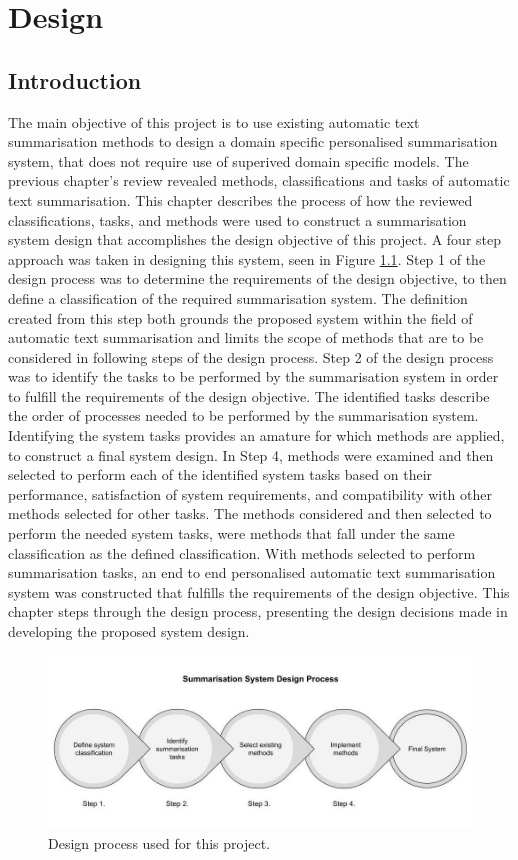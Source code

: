 \chapter{Design}

\section{Introduction}
    The main objective of this project is to use existing automatic text summarisation methods to design a domain specific personalised summarisation system, that does not require use of superived domain specific models. The previous chapter’s review revealed methods, classifications and tasks of automatic text summarisation. This chapter describes the process of how the reviewed classifications, tasks, and methods were used to construct a summarisation system design that accomplishes the design objective of this project. A four step approach was taken in designing this system, seen in Figure \ref{design}. Step 1 of the design process was to determine the requirements of the design objective, to then define a classification of the required summarisation system. The definition created from this step both grounds the proposed system within the field of automatic text summarisation and limits the scope of methods that are to be considered in following steps of the design process. Step 2 of the design process was to identify the tasks to be performed by the summarisation system in order to fulfill the requirements of the design objective. The identified tasks describe the order of processes needed to be performed by the summarisation system. Identifying the system tasks provides an amature for which methods are applied, to construct a final system design. In Step 4, methods were examined and then selected to perform each of the identified system tasks based on their performance, satisfaction of system requirements, and compatibility with other methods selected for other tasks. The methods considered and then selected to perform the needed system tasks, were methods that fall under the same classification as the defined classification. With methods selected to perform summarisation tasks, an end to end personalised automatic text summarisation system was constructed that fulfills the requirements of the design objective. This chapter steps through the design process, presenting the design decisions made in developing the proposed system design.

\begin{figure}
    \centering
         \includegraphics[width=1.0\textwidth]{Figures/Design_Process.jpg}
          \caption{Design process used for this project.}
           \label{design}
\end{figure}

